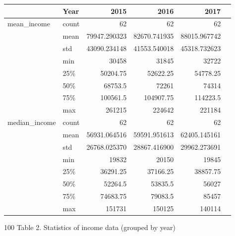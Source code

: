 \documentclass{article}
\begin{document}
\begin{tabular}{llrrrr}
\toprule              & Year &         2015 &         2016 &         2017 & \\
\midrule

mean\_income & count &      62 &      62 &      62 & \\              & mean &   79947.290323 &   82670.741935 &   88015.967742 & \\              & std &   43090.234148 &   41553.540018 &   45318.732623 & \\              & min &   30458 &   31845 &   32722 \\              & 25\% &   50204.75 &   52622.25 &   54778.25 & \\              & 50\% &   68753.5 &   72261 &   74314 & \\              & 75\% &  100561.5 &  104907.75 &  114223.5 & \\              & max &  261215 &  224642 &  221184 & \\median\_income & count &      62 &      62 &      62 & \\              & mean &   56931.064516 &   59591.951613 &   62405.145161 & \\              & std &   26768.025370 &   28867.416900 &   29962.273691 & \\              & min &   19832 &   20150 &   19845 & \\              & 25\% &   36291.25 &   37166.25 &   38857.75 & \\              & 50\% &   52264.5 &   53835.5 &   56027 & \\              & 75\% &   74683.75 &   79083.5 &   85457 & \\              & max &  151731 &  150125 &  140114 & \\
\bottomrule
\end{tabular}
\centerline{{\color{white} 100} Table 2. Statistics of income data (grouped by year)}




\end{document}
